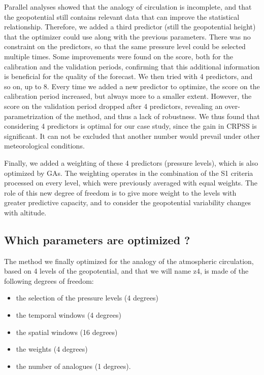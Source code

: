 \documentclass[twocol]{ametsoc}
\begin{document}
Parallel analyses showed that the analogy of circulation is incomplete, and that the geopotential still contains relevant data that can improve the statistical relationship. Therefore, we added a third predictor (still the geopotential height) that the optimizer could use along with the previous parameters. There was no constraint on the predictors, so that the same pressure level could be selected multiple times. Some improvements were found on the score, both for the calibration and the validation periods, confirming that this additional information is beneficial for the quality of the forecast. We then tried with 4 predictors, and so on, up to 8. Every time we added a new predictor to optimize, the score on the calibration period increased, but always more to a smaller extent. However, the score on the validation period dropped after 4 predictors, revealing an over-parametrization of the method, and thus a lack of robustness. We thus found that considering 4 predictors is optimal for our case study, since the gain in CRPSS is significant. It can not be excluded that another number would prevail under other meteorological conditions.

Finally, we added a weighting of these 4 predictors (pressure levels), which is also optimized by GAs. The weighting operates in the combination of the S1 criteria processed on every level, which were previously averaged with equal weights. The role of this new degree of freedom is to give more weight to the levels with greater predictive capacity, and to consider the geopotential variability changes with altitude. 


\subsection{Which parameters are optimized ?}

The method we finally optimized for the analogy of the atmospheric circulation, based on 4 levels of the geopotential, and that we will name z4, is made of the following degrees of freedom:

\begin{itemize}
	\setlength\itemsep{-4px}
	\item the selection of the pressure levels (4 degrees)
	\item the temporal windows (4 degrees)
	\item the spatial windows (16 degrees)
	\item the weights (4 degrees)
	\item the number of analogues (1 degrees).
\end{itemize}
\end{document}
